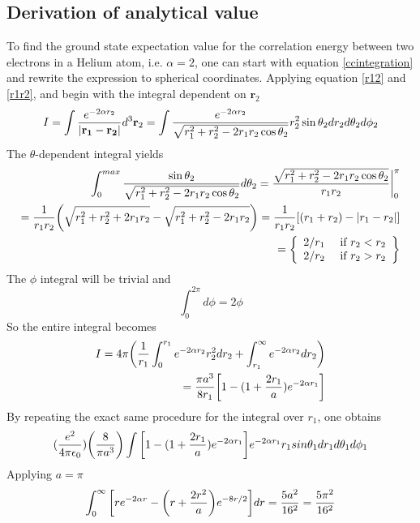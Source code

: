 \documentclass[%
reprint,nofootinbib,
amsmath,amssymb,
aps,
]{revtex4-1}
\begin{document}
\subsection{Derivation of analytical value}\noindent 
To find the ground state expectation value for the correlation energy between two electrons in a Helium atom, i.e. $\alpha = 2$, one can start with equation \ref{ccintegration} and rewrite the expression to spherical coordinates. Applying equation \ref{r12} and \ref{r1r2}, and begin with the integral dependent on $\mathbf{r}_2$
\begin{equation*}
	I = \int \dfrac{e^{-2\alpha r_2}}{\abs{\mathbf{r_1}-\mathbf{r_2}}}d^3\mathbf{r}_2 = \int \dfrac{e^{-2\alpha r_2}}{\sqrt{r_1^2+r_2^2-2r_1r_2\cos\theta_2}}r_2^2\sin\theta_2dr_2d\theta_2d\phi_2 
\end{equation*}
The $\theta$-dependent integral yields
\begin{align*}
	\int_{0}^{max}\dfrac{\sin\theta_2}{\sqrt{r_1^2+r_2^2-2r_1r_2\cos\theta_2}}d\theta_2 = \dfrac{\sqrt{r_1^2+r_2^2-2r_1r_2\cos\theta_2}}{r_1r_2} \bigg|_0^\pi \\
	= \dfrac{1}{r_1r_2}\qty(\sqrt{r_1^2+r_2^2 + 2r_1r_2} - \sqrt{r_1^2+r_2^2 -2r_1r_2})
	= \dfrac{1}{r_1r_2}\qty[(r_1+r_2)-\abs{r_1-r_2}]\\
	= 	 \left\{
	\begin{array}{ll}
	2/r_1 & \textnormal{ if } r_2 < r_2\\
	2/r_2 & \textnormal{ if } r_2 > r_2
	\end{array} \right\} \\ 
\end{align*}
The $\phi$ integral will be trivial and
\begin{equation*}
	\int_{0}^{2\pi}d\phi = 2\phi
\end{equation*}
So the entire integral becomes 
\begin{align*}
	I = 4\pi\qty(\dfrac{1}{r_1}\int_{0}^{r_1}e^{-2\alpha r_2}r_2^2dr_2 + \int_{r_1}^{\infty}e^{-2\alpha r_2}dr_2) \\ 
	= \dfrac{\pi a^3}{8r_1}\qty[1-(1+\dfrac{2r_1}{a})e^{-2\alpha r_1}]
\end{align*}
By repeating the exact same procedure for the integral over $r_1$, one obtains
\begin{align*}
	(\dfrac{e^2}{4\pi\epsilon_0})\qty(\dfrac{8}{\pi a^3})\int\qty[1-(1+\dfrac{2r_1}{a})e^{-2\alpha r_1}]e^{-2\alpha r_1}r_1sin\theta_1dr_1d\theta_1d\phi_1
\end{align*}
Applying $a=\pi$
\begin{equation*}
	\int_{0}^{\infty}\qty[re^{-2\alpha r}-\qty(r+\dfrac{2r^2}{a})e^{-8r/2}]dr = \dfrac{5a^2}{16^2} = \dfrac{5\pi^2}{16^2}
\end{equation*}
\end{document}
